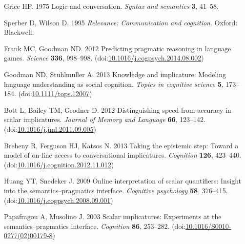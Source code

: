 \documentclass{rsos}
\begin{document}
%
\begin{thebibliography}{10}

\hypertarget{refs}{}

\hypertarget{ref-grice1975logic}{}
  Grice HP. 1975 Logic and conversation. \emph{Syntax and semantics}
\textbf{3}, 41--58.

\hypertarget{ref-sperber1986}{}
 Sperber D, Wilson D. 1995 \emph{Relevance: Communication and
cognition}. Oxford: Blackwell.

\hypertarget{ref-frank2012}{}
  Frank MC, Goodman ND. 2012 Predicting pragmatic reasoning in language
games. \emph{Science} \textbf{336}, 998--998.
(doi:\href{https://doi.org/10.1016/j.cogpsych.2014.08.002}{10.1016/j.cogpsych.2014.08.002})

\hypertarget{ref-goodman2013}{}
  Goodman ND, Stuhlmuller A. 2013 Knowledge and implicature: Modeling
language understanding as social cognition. \emph{Topics in cognitive
science} \textbf{5}, 173--184.
(doi:\href{https://doi.org/10.1111/tops.12007}{10.1111/tops.12007})

\hypertarget{ref-bott2012}{}
  Bott L, Bailey TM, Grodner D. 2012 Distinguishing speed from accuracy
in scalar implicatures. \emph{Journal of Memory and Language}
\textbf{66}, 123--142.
(doi:\href{https://doi.org/10.1016/j.jml.2011.09.005}{10.1016/j.jml.2011.09.005})

\hypertarget{ref-breheny2013}{}
 Breheny R, Ferguson HJ, Katsos N. 2013 Taking the epistemic step:
Toward a model of on-line access to conversational implicatures.
\emph{Cognition} \textbf{126}, 423--440.
(doi:\href{https://doi.org/10.1016/j.cognition.2012.11.012}{10.1016/j.cognition.2012.11.012})

\hypertarget{ref-huang2009a}{}
 Huang YT, Snedeker J. 2009 Online interpretation of scalar
quantifiers: Insight into the semantics--pragmatics interface.
\emph{Cognitive psychology} \textbf{58}, 376--415.
(doi:\href{https://doi.org/10.1016/j.cogpsych.2008.09.001}{10.1016/j.cogpsych.2008.09.001})

\hypertarget{ref-papafragou2003}{}
 Papafragou A, Musolino J. 2003 Scalar implicatures: Experiments at
the semantics--pragmatics interface. \emph{Cognition} \textbf{86},
253--282.
(doi:\href{https://doi.org/10.1016/S0010-0277(02)00179-8}{10.1016/S0010-0277(02)00179-8})


\end{thebibliography}
\end{document}
